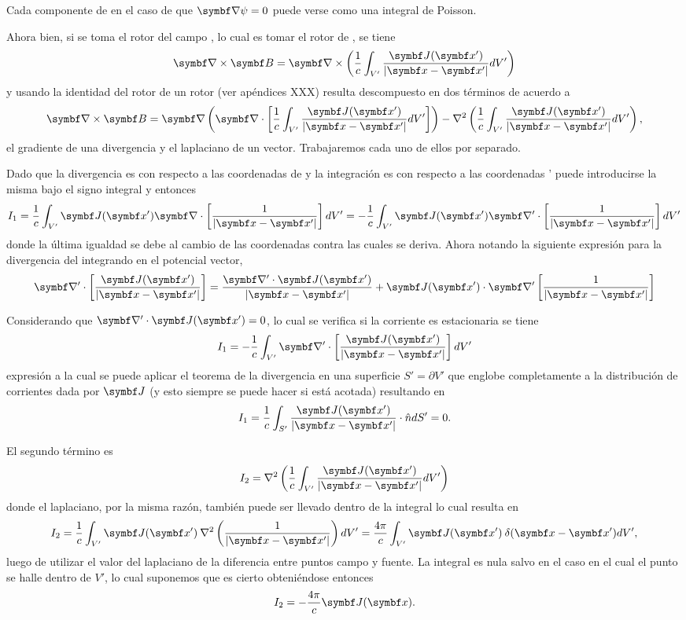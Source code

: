 \documentclass[10pt,oneside]{CBFT_book}
\begin{document}
Cada componente de  en el caso de que $\Nabla\psi=0$ puede verse como una integral de Poisson.

Ahora bien, si se toma el rotor del campo , lo cual es tomar el rotor de , se tiene
\[
	\rotorm{B} = \Nabla\times\left( \frac{1}{c} \int_{V'} \frac{\vb{J}(\vb{x}')}{|\vb{x}-\vb{x}'|} dV' \right)
\]
y usando la identidad del rotor de un rotor (ver apéndices XXX) resulta descompuesto en dos términos de
acuerdo a
\[
	\rotorm{B} = 
	\Nabla\left( \Nabla \cdot \left[ \frac{1}{c} 
		\int_{V'} \frac{\vb{J}(\vb{x}')}{|\vb{x}-\vb{x}'|} dV' \right] \right) -
	\nabla^2 \left( \frac{1}{c} \int_{V'} \frac{\vb{J}(\vb{x}')}{|\vb{x}-\vb{x}'|} dV' \right),
\]
el gradiente de una divergencia y el laplaciano de un vector. Trabajaremos cada uno de ellos por 
separado. 

Dado que la divergencia es con respecto a las coordenadas de  y la integración es con respecto
a las coordenadas ' puede introducirse la misma bajo el signo integral y entonces
\[
	I_1 = \frac{1}{c} 
		\int_{V'} \vb{J}(\vb{x}') \Nabla \cdot \left[ \frac{ 1 }{|\vb{x}-\vb{x}'|} \right] dV'
		= - \frac{1}{c} 
		\int_{V'} \vb{J}(\vb{x}') \Nabla' \cdot \left[ \frac{ 1 }{|\vb{x}-\vb{x}'|} \right] dV'
\]
donde la última igualdad se debe al cambio de las coordenadas contra las cuales se deriva.
Ahora notando la siguiente expresión para la divergencia del integrando en el potencial vector,
\[
	\Nabla' \cdot \left[ \frac{ \vb{J}(\vb{x}') }{|\vb{x}-\vb{x}'|} \right] =
	\frac{ \Nabla' \cdot \vb{J}(\vb{x}') }{|\vb{x}-\vb{x}'|} +
	 \vb{J}(\vb{x}') \cdot \Nabla' \left[ \frac{ 1 }{|\vb{x}-\vb{x}'|} \right]
\]

Considerando que $\Nabla'\cdot\vb{J}(\vb{x}')=0$, lo cual se verifica si
la corriente es estacionaria se tiene 
\[
	I_1 = - \frac{1}{c} 
	\int_{V'} \Nabla' \cdot \left[ \frac{ \vb{J}(\vb{x}')  }{|\vb{x}-\vb{x}'|} \right] dV'
\]
expresión a la cual se puede aplicar el teorema de la divergencia en una superficie 
$ S' = \partial V' $ que englobe completamente a la distribución de corrientes dada por 
$\vb{J}$ (y esto siempre se puede hacer si  está acotada) resultando en 
\[
	I_1 = \frac{1}{c} \int_{S'} 
	\frac{ \vb{J}(\vb{x}')  }{|\vb{x}-\vb{x}'|} \cdot \hat{n} dS' = 0.
\]

El segundo término es 
\[
	I_2 = \nabla^2 \left( \frac{1}{c} \int_{V'} \frac{\vb{J}(\vb{x}')}{|\vb{x}-\vb{x}'|} dV' \right)
\]
donde el laplaciano, por la misma razón, también puede ser llevado dentro de la integral lo 
cual resulta en 
\[
	I_2 = \frac{1}{c} \int_{V'} \vb{J}(\vb{x}') \: \nabla^2 \left( \frac{1}{|\vb{x}-\vb{x}'|} \right) dV'
	= \frac{4 \pi }{c} \int_{V'} \vb{J}(\vb{x}') \: \delta( \vb{x}-\vb{x}') dV',
\]
luego de utilizar el valor del laplaciano de la diferencia entre puntos campo y fuente. La
integral es nula salvo en el caso en el cual el punto  se halle dentro de $V'$, lo cual 
suponemos que es cierto obteniéndose entonces 
\[
	I_2 = - \frac {4 \pi} {c} \vb{J}(\vb{x}).
\]
\end{document}
